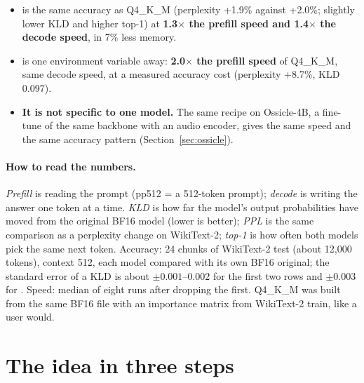 \documentclass[11pt,a4paper]{article}
\newcommand{\tx}[1]{\texttt{\detokenize{#1}}}
\begin{document}
\begin{itemize}
\item \textbf{\tx{quality}} is the same accuracy as Q4\_K\_M (perplexity +1.9\% against +2.0\%; slightly lower KLD and higher top-1) at \textbf{1.3$\times$ the prefill speed and
1.4$\times$ the decode speed}, in 7\% less memory.
\item \textbf{\tx{fast}} is one environment variable away: \textbf{2.0$\times$ the prefill speed} of Q4\_K\_M, same decode speed, at a measured accuracy cost
(perplexity +8.7\%, KLD 0.097).
\item \textbf{It is not specific to one model.} The same recipe on Ossicle-4B, a fine-tune of the same backbone with an audio encoder, gives the same speed and the same
accuracy pattern (Section~\ref{sec:ossicle}).
\end{itemize}

\paragraph{How to read the numbers.} \emph{Prefill} is reading the prompt (pp512 = a 512-token prompt); \emph{decode} is writing the answer one token at a time.
\emph{KLD} is how far the model's output probabilities have moved from the original BF16 model (lower is better); \emph{PPL} is the same comparison as a perplexity change on
WikiText-2; \emph{top-1} is how often both models pick the same next token. Accuracy: 24 chunks of WikiText-2 test (about 12{,}000 tokens), context 512, each model compared with
its own BF16 original; the standard error of a KLD is about $\pm0.001$--$0.002$ for the first two rows and $\pm0.003$ for \tx{fast}. Speed: median of eight \tx{llama-bench} runs
after dropping the first. Q4\_K\_M was built from the same BF16 file with an importance matrix from WikiText-2 train, like a user would.

\section{The idea in three steps}

\begin{figure}[H]
\centering
{}
\end{figure}
\end{document}
